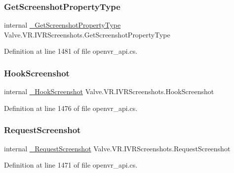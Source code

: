 \subsubsection{\texorpdfstring{GetScreenshotPropertyType}{GetScreenshotPropertyType}}
{\footnotesize\ttfamily internal \mbox{\hyperlink{struct_valve_1_1_v_r_1_1_i_v_r_screenshots_a2a0f40d54fa11a1803abb2ddca3e3748}{\+\_\+\+Get\+Screenshot\+Property\+Type}} Valve.\+V\+R.\+I\+V\+R\+Screenshots.\+Get\+Screenshot\+Property\+Type}



Definition at line 1481 of file openvr\+\_\+api.\+cs.

\mbox{\label{struct_valve_1_1_v_r_1_1_i_v_r_screenshots_a697fa15e63c07e55d436021b067eee7d}} 
\subsubsection{\texorpdfstring{HookScreenshot}{HookScreenshot}}
{\footnotesize\ttfamily internal \mbox{\hyperlink{struct_valve_1_1_v_r_1_1_i_v_r_screenshots_ab3be7fe0de54d42becef8b3c699340c3}{\+\_\+\+Hook\+Screenshot}} Valve.\+V\+R.\+I\+V\+R\+Screenshots.\+Hook\+Screenshot}



Definition at line 1476 of file openvr\+\_\+api.\+cs.

\mbox{\label{struct_valve_1_1_v_r_1_1_i_v_r_screenshots_a3609d78ec65ba91f56a01ebf1b03ac37}} 
\subsubsection{\texorpdfstring{RequestScreenshot}{RequestScreenshot}}
{\footnotesize\ttfamily internal \mbox{\hyperlink{struct_valve_1_1_v_r_1_1_i_v_r_screenshots_af21bcc56545f1819ed8b9e255f184fd4}{\+\_\+\+Request\+Screenshot}} Valve.\+V\+R.\+I\+V\+R\+Screenshots.\+Request\+Screenshot}



Definition at line 1471 of file openvr\+\_\+api.\+cs.

